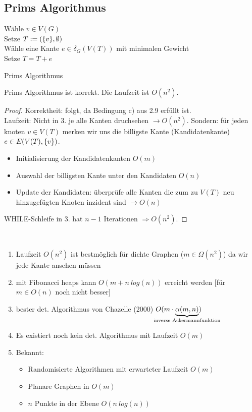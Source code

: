 \subsection*{Prims Algorithmus}
\begin{algorithm}
	\vspace*{5pt}
	Wähle $v\in V(G)$\\
	Setze $T:=(\{v\}, \emptyset)$\\
	{
		Wähle eine Kante $e\in \delta_G(V(T))$ mit minimalen Gewicht\\
		Setze $T=T+e$
	}
	\caption{Prims Algorithmus}
	\label{fig:Algorithmus}
\end{algorithm}
\begin{satz}
	Prims Algorithmus ist korrekt. Die Laufzeit ist $O(n^2)$.
\end{satz}
\begin{proof}
	Korrektheit: folgt, da Bedingung c) aus 2.9 erfüllt ist.\\
	Laufzeit: Nicht in 3. je alle Kanten druchsehen $\to O(n^2)$. Sondern: für jeden knoten $v\in V(T)$ merken wir uns die billigste Kante (\dq Kandidatenkante\dq) $e\in E(V(T), \{v\})$.
	\begin{itemize}
		\item Initialisierung der Kandidatenkanten $O(m)$
		\item Auswahl der billigsten Kante unter den Kandidaten $O(n)$
		\item Update der Kandidaten: überprüfe alle Kanten die zum zu $V(T)$ neu hinzugefügten Knoten inzident sind $\to O(n)$
	\end{itemize}
	WHILE-Schleife in 3. hat $n-1$ Iterationen $\Rightarrow O(n^2)$.
\end{proof}
\begin{rem}~
	\begin{enumerate}
		\item Laufzeit $O(n^2)$ ist bestmöglich für dichte Graphen ($m\in \Omega(n^2)$) da wir jede Kante ansehen müssen
		\item mit Fibonacci heaps kann $O(m+n~log(n))$ erreicht werden [für $m\in O(n)$ noch nicht besser]
		\item bester det. Algorithmus von Chazelle (2000) $O(m\cdot \underbrace{\alpha(m,n)}_{\mathclap{\text{inverse Ackermannfunktion}}})$
		\item Es existiert noch kein det. Algorithmus mit Laufzeit $O(m)$
		\item Bekannt:
		\begin{itemize}
			\item Randomisierte Algorithmen mit erwarteter Laufzeit $O(m)$
			\item Planare Graphen in $O(m)$
			\item $n$ Punkte in der Ebene $O(n~log(n))$
		\end{itemize}
	\end{enumerate}
\end{rem}
	